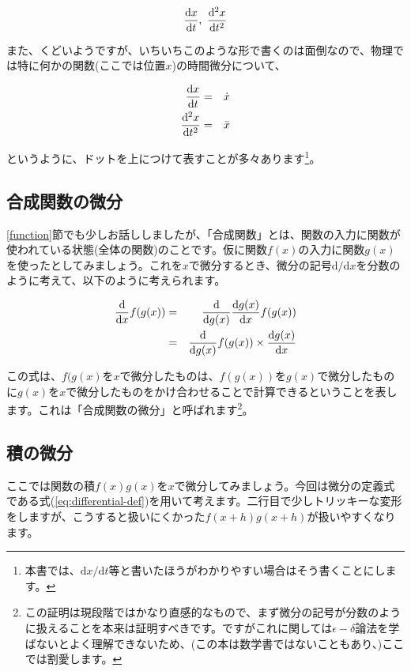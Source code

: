 \begin{eqnarray}
    \frac{\mathrm{d}x}{\mathrm{d}t} \notag ,\ 
    \frac{\mathrm{d^2}x}{\mathrm{d}t^2} \notag
\end{eqnarray}

また、くどいようですが、いちいちこのような形で書くのは面倒なので、物理では特に何かの関数(ここでは位置$x$)の時間微分について、

\begin{eqnarray}
    \frac{\mathrm{d}x}{\mathrm{d}t} &=& \dot{x} \notag \\
    \frac{\mathrm{d^2}x}{\mathrm{d}t^2} &=& \ddot{x} \notag
\end{eqnarray}

というように、ドットを上につけて表すことが多々あります\footnote{本書では、$\mathrm{d}x/\mathrm{d}t$等と書いたほうがわかりやすい場合はそう書くことにします。}。


\subsection{合成関数の微分}
\label{differential-composite}
\ref{function}節でも少しお話ししましたが、「合成関数」とは、関数の入力に関数が使われている状態(全体の関数)のことです。仮に関数$f(x)$の入力に関数$g(x)$を使ったとしてみましょう。これを$x$で微分するとき、微分の記号$\mathrm{d}/\mathrm{d}x$を分数のように考えて、以下のように考えられます。

\begin{eqnarray}
    \frac{\mathrm{d}}{\mathrm{d}x}f(g(x)) &=& \frac{\mathrm{d}}{\mathrm{d}g(x)}\frac{\mathrm{d}g(x)}{\mathrm{d}x}f(g(x)) \notag \\
    &=& \frac{\mathrm{d}}{\mathrm{d}g(x)}f(g(x))\times \frac{\mathrm{d}g(x)}{\mathrm{d}x}
\end{eqnarray}

この式は、$f(g(x)$を$x$で微分したものは、$f(g(x))$を$g(x)$で微分したものに$g(x)$を$x$で微分したものをかけ合わせることで計算できるということを表します。これは「合成関数の微分」と呼ばれます\footnote{この証明は現段階ではかなり直感的なもので、まず微分の記号が分数のように扱えることを本来は証明すべきです。ですがこれに関しては$\epsilon-\delta$論法を学ばないとよく理解できないため、(この本は数学書ではないこともあり、)ここでは割愛します。}。

\subsection{積の微分}
\label{differential-product}
ここでは関数の積$f(x)g(x)$を$x$で微分してみましょう。今回は微分の定義式である式(\ref{eq:differential-def})を用いて考えます。二行目で少しトリッキーな変形をしますが、こうすると扱いにくかった$f(x+h)g(x+h)$が扱いやすくなります。

